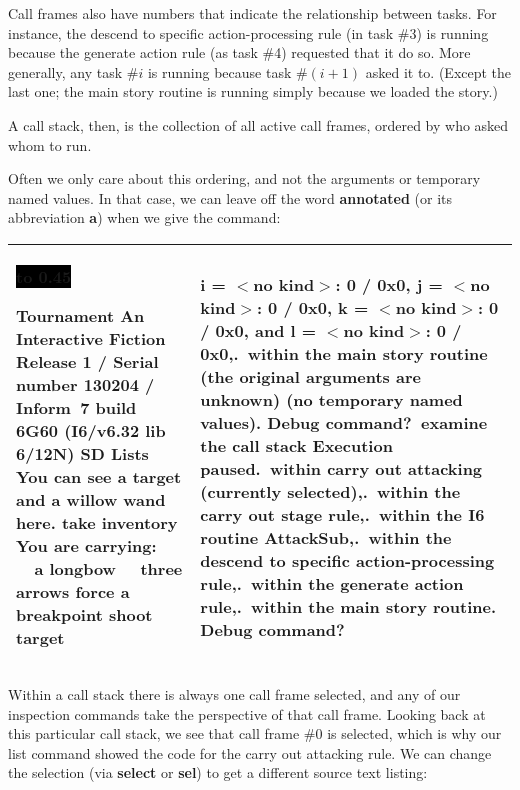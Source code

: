 \documentclass{book}
\newcommand{\n}{\hspace*{\fill}\newline}
\newcommand{\terp}[2]{\begin{center}\begin{tabular}{p{0.45\textwidth}|p{0.45\textwidth}}\midrule #1&#2\\\midrule\end{tabular}\end{center}}
\newcommand{\glkheading}[1]{\textbf{#1}}
\newcommand{\glkinput}[1]{\textbf{#1}}
\newcommand{\glkstatusline}[2]{\centerline{\colorbox{black}{\hbox to 0.45\textwidth{\textcolor{white}{#1\hfil #2}}}}}
\newcommand{\storyprompt}{\raisebox{1.5pt}{\(>\)}}
\newcommand{\cursor}{\raisebox{-1.5pt}{\RectangleThin}}
\begin{document}
Call frames also have numbers that indicate the relationship between tasks.  For
instance, the descend to specific action-processing rule (in task \#3) is
running because the generate action rule (as task \#4) requested that it do so.
More generally, any task \#\(i\) is running because task \#\((i+1)\) asked it
to.  (Except the last one; the main story routine is running simply because we
loaded the story.)

A call stack, then, is the collection of all active call frames, ordered by who
asked whom to run.

Often we only care about this ordering, and not the arguments or temporary named
values.  In that case, we can leave off the word \glkinput{annotated} (or its
abbreviation \glkinput{a}) when we give the command:

\terp{\glkstatusline{Lists}{0/2}\n
  \glkheading{Tournament}\n
  An Interactive Fiction\n
  Release 1 / Serial number 130204 / Inform~7 build 6G60 (I6/v6.32 lib 6/12N) SD\n
  \n
  \glkheading{Lists}\n
  You can see a target and a willow wand here.\n
  \n
  \storyprompt\glkinput{take inventory}\n
  You are carrying:\n
  \null\ \ a longbow\n
  \null\ \ three arrows\n
  \n
  \storyprompt\glkinput{force a breakpoint}\n
  \storyprompt\glkinput{shoot target}}{%
  \qquad \qquad i = \(<\)no kind\(>\): 0 / 0x0,\n
  \null\qquad \qquad j = \(<\)no kind\(>\): 0 / 0x0,\n
  \null\qquad \qquad k = \(<\)no kind\(>\): 0 / 0x0, and\n
  \null\qquad \qquad l = \(<\)no kind\(>\): 0 / 0x0,\n
  5.\ within the main story routine\n
  \null\qquad (the original arguments are unknown)\n
  \null\qquad (no temporary named values).\n
  \n
  Debug command?\ \glkinput{examine the call stack}\n
  \n
  Execution paused\n
  0.\ within carry out attacking (currently selected),\n
  1.\ within the carry out stage rule,\n
  2.\ within the I6 routine AttackSub,\n
  3.\hbox{\ }within the descend to specific action-processing rule,\n
  4.\ within the generate action rule,\n
  5.\ within the main story routine.\n
  \n
  Debug command?\ \cursor}

Within a call stack there is always one call frame selected, and any of our
inspection commands take the perspective of that call frame.  Looking back at
this particular call stack, we see that call frame \#0 is selected, which is why
our list command showed the code for the carry out attacking rule.  We can
change the selection (via \glkinput{select} or \glkinput{sel}) to get a
different source text listing:
\end{document}

